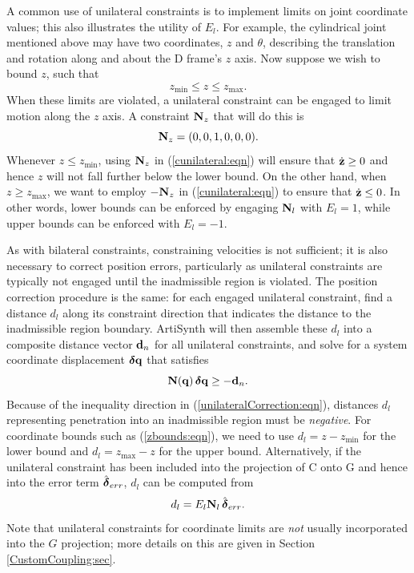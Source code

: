 A common use of unilateral constraints is to implement limits on joint
coordinate values; this also illustrates the utility of $E_l$.  For
example, the cylindrical joint mentioned above may have two
coordinates, $z$ and $\theta$, describing the translation and rotation
along and about the D frame's $z$ axis.  Now suppose we wish to bound
$z$, such that
%
\begin{equation}
z_\text{min} \le z \le z_\text{max}.
\label{zbounds:eqn}
\end{equation}
%
When these limits are violated, a unilateral constraint can be engaged
to limit motion along the $z$ axis.
A constraint ${\bf N}_z$
that will do this is 
%
\begin{equation*}
{\bf N}_z = (0, 0, 1, 0, 0, 0).
\end{equation*}
%
Whenever $z \le z_\text{min}$, using ${\bf N}_z$ in (\ref{cunilateral:eqn})
will ensure that $\dot{{\bf z}} \ge 0$ and hence $z$ will not fall further
below the lower bound.  On the other hand, when $z \ge z_\text{max}$,
we want to employ $-{\bf N}_z$ in (\ref{cunilateral:eqn}) to ensure that
$\dot{{\bf z}} \le 0$. In other words, lower bounds can be enforced by
engaging ${\bf N}_l$ with $E_l = 1$, while upper bounds can be enforced
with $E_l = -1$.

As with bilateral constraints, constraining velocities is not
sufficient; it is also necessary to correct position errors,
particularly as unilateral constraints are typically not engaged until
the inadmissible region is violated. The position correction procedure
is the same: for each engaged unilateral constraint, find a distance
$d_l$ along its constraint direction that indicates the distance to
the inadmissible region boundary.  ArtiSynth will then assemble these
$d_l$ into a composite distance vector ${\bf d}_n$ for all unilateral
constraints, and solve for a system coordinate displacement $\boldsymbol\delta {\bf q}$
that satisfies
%
\begin{equation}
{\bf N}({\bf q}) \, \boldsymbol\delta {\bf q} \ge -{\bf d}_n.
\label{unilateralCorrection:eqn}
\end{equation}
%
Because of the inequality direction in
(\ref{unilateralCorrection:eqn}), distances $d_l$ representing
penetration into an inadmissible region must be {\it negative}.  For
coordinate bounds such as (\ref{zbounds:eqn}), we need to use $d_l = z
- z_\text{min}$ for the lower bound and $d_l = z_\text{max} - z$ for
the upper bound. Alternatively, if the unilateral constraint has been
included into the projection of C onto G and hence into the error term
$\hat{\boldsymbol\delta}_{err}$, $d_l$ can be computed from
%
\begin{equation}
d_l = E_l {\bf N}_l \, \hat{\boldsymbol\delta}_{err}.
\end{equation}
%
Note that unilateral constraints for coordinate limits are {\it not}
usually incorporated into the $G$ projection; more details on this are
given in Section \ref{CustomCoupling:sec}.

